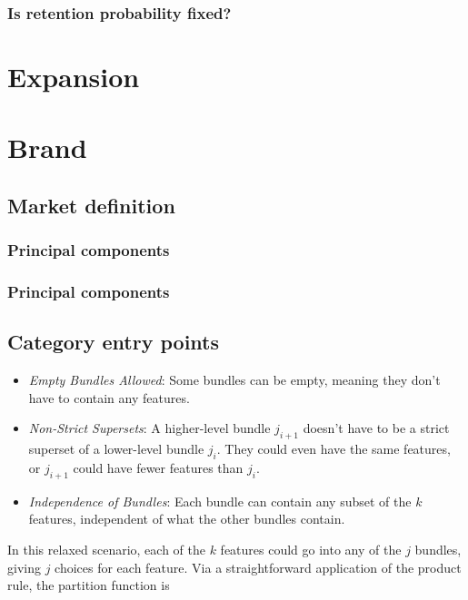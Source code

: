 \documentclass{article}
\begin{document}
\subsubsection{Is retention probability fixed?}

\section{Expansion}

\section{Brand}

\subsection{Market definition}

\subsubsection{Principal components}

\subsubsection{Principal components}

\subsection{Category entry points}


\begin{itemize}
    \item \textit{Empty Bundles Allowed}: Some bundles can be empty, meaning they don't have to contain any features.
    \item \textit{Non-Strict Supersets}: A higher-level bundle \( j_{i+1} \) doesn't have to be a strict superset of a lower-level bundle \( j_i \). They could even have the same features, or \( j_{i+1} \) could have fewer features than \( j_i \).
    \item \textit{Independence of Bundles}: Each bundle can contain any subset of the \( k \) features, independent of what the other bundles contain.
\end{itemize}

In this relaxed scenario, each of the \( k \) features could go into any of the \( j \) bundles, giving \( j \) choices for each feature. Via a straightforward application of the product rule, the partition function is \\
\end{document}
